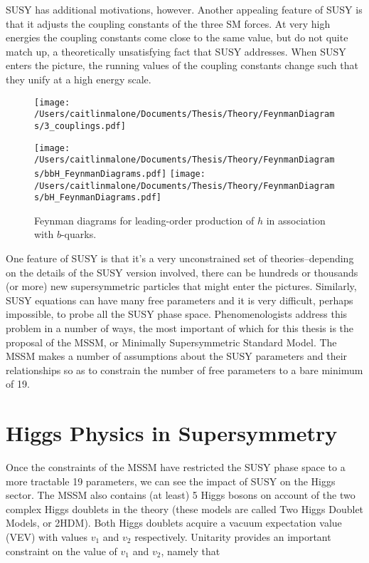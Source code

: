 SUSY has additional motivations, however.  Another appealing feature of SUSY is that it adjusts the coupling constants of the three SM forces.  At very high energies the coupling constants come close to the same value, but do not quite match up, a theoretically unsatisfying fact that SUSY addresses.  When SUSY enters the picture, the running values of the coupling constants change such that they unify at a high energy scale.

\begin{figure}
	\texttt{[image: /Users/caitlinmalone/Documents/Thesis/Theory/FeynmanDiagrams/3\_couplings.pdf]}
	\label{fig:couplings}
\end{figure}

\begin{figure}[H]
	\caption{Feynman diagrams for leading-order production of $h$ in association with $b$-quarks.  }
	\texttt{[image: /Users/caitlinmalone/Documents/Thesis/Theory/FeynmanDiagrams/bbH\_FeynmanDiagrams.pdf]}		
	\texttt{[image: /Users/caitlinmalone/Documents/Thesis/Theory/FeynmanDiagrams/bH\_FeynmanDiagrams.pdf]}
	\label{fig:couplings}
\end{figure}


One feature of SUSY is that it's a very unconstrained set of theories--depending on the details of the SUSY version involved, there can be hundreds or thousands (or more) new supersymmetric particles that might enter the pictures.  Similarly, SUSY equations can have many free parameters and it is very difficult, perhaps impossible, to probe all the SUSY phase space.  Phenomenologists address this problem in a number of ways, the most important of which for this thesis is the proposal of the MSSM, or Minimally Supersymmetric Standard Model.  The MSSM makes a number of assumptions about the SUSY parameters and their relationships so as to constrain the number of free parameters to a bare minimum of 19.  

\section{Higgs Physics in Supersymmetry}
Once the constraints of the MSSM have restricted the SUSY phase space to a more tractable 19 parameters, we can see the impact of SUSY on the Higgs sector.  The MSSM also contains (at least) 5 Higgs bosons on account of the two complex Higgs doublets in the theory (these models are called Two Higgs Doublet Models, or 2HDM).  Both Higgs doublets acquire a vacuum expectation value (VEV) with values $v_1$ and $v_2$ respectively.  Unitarity provides an important constraint on the value of $v_1$ and $v_2$, namely that 

